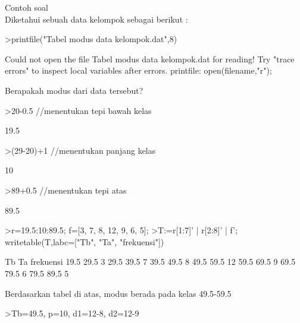 \documentclass[a4paper,10pt]{article}
\begin{document}
\begin{eulernotebook}
\begin{eulercomment}
\begin{eulercomment}
\begin{eulercomment}
\begin{eulercomment}
\begin{eulercomment}
\begin{eulercomment}
\begin{eulercomment}
\begin{eulercomment}
\begin{eulercomment}
\begin{eulercomment}
\begin{eulercomment}
\begin{eulercomment}
\begin{eulercomment}
\begin{eulercomment}
\begin{eulercomment}
Contoh soal\\
Diketahui sebuah data kelompok sebagai berikut :
\end{eulercomment}
\begin{eulerprompt}
>printfile("Tabel modus data kelompok.dat",8) 
\end{eulerprompt}
\begin{euleroutput}
  Could not open the file
  Tabel modus data kelompok.dat
  for reading!
  Try "trace errors" to inspect local variables after errors.
  printfile:
      open(filename,"r");
\end{euleroutput}
\begin{eulercomment}
Berapakah modus dari data tersebut?
\end{eulercomment}
\begin{eulerprompt}
>20-0.5  //menentukan tepi bawah kelas
\end{eulerprompt}
\begin{euleroutput}
  19.5
\end{euleroutput}
\begin{eulerprompt}
>(29-20)+1 //menentukan panjang kelas
\end{eulerprompt}
\begin{euleroutput}
  10
\end{euleroutput}
\begin{eulerprompt}
>89+0.5 //menentukan tepi atas
\end{eulerprompt}
\begin{euleroutput}
  89.5
\end{euleroutput}
\begin{eulerprompt}
>r=19.5:10:89.5; f=[3, 7, 8, 12, 9, 6, 5];
>T:=r[1:7]' | r[2:8]' | f'; writetable(T,labc=["Tb", "Ta", "frekuensi"])
\end{eulerprompt}
\begin{euleroutput}
          Tb        Ta frekuensi
        19.5      29.5         3
        29.5      39.5         7
        39.5      49.5         8
        49.5      59.5        12
        59.5      69.5         9
        69.5      79.5         6
        79.5      89.5         5
\end{euleroutput}
\begin{eulercomment}
Berdasarkan tabel di atas, modus berada pada kelas 49.5-59.5
\end{eulercomment}
\begin{eulerprompt}
>Tb=49.5, p=10, d1=12-8, d2=12-9
\end{eulerprompt}
\begin{euleroutput}

\end{euleroutput}
\end{eulercomment}
\end{eulercomment}
\end{eulercomment}
\end{eulercomment}
\end{eulercomment}
\end{eulercomment}
\end{eulercomment}
\end{eulercomment}
\end{eulercomment}
\end{eulercomment}
\end{eulercomment}
\end{eulercomment}
\end{eulercomment}
\end{eulercomment}
\end{eulernotebook}
\end{document}

